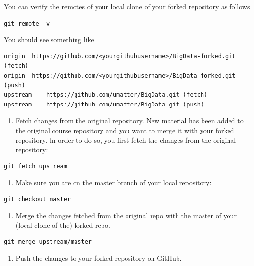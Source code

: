 \documentclass[
  12pt,
]{style/krantz}
\providecommand{\tightlist}{%
  \setlength{\itemsep}{0pt}\setlength{\parskip}{0pt}}
\begin{document}
You can verify the remotes of your local clone of your forked repository as follows

\begin{verbatim}
git remote -v
\end{verbatim}

You should see something like

\begin{verbatim}
origin  https://github.com/<yourgithubusername>/BigData-forked.git (fetch)
origin  https://github.com/<yourgithubusername>/BigData-forked.git (push)
upstream    https://github.com/umatter/BigData.git (fetch)
upstream    https://github.com/umatter/BigData.git (push)
\end{verbatim}

\begin{enumerate}
\def\labelenumi{\arabic{enumi}.}
\setcounter{enumi}{4}
\tightlist
\item
  Fetch changes from the original repository. New material has been added to the original course repository and you want to merge it with your forked repository. In order to do so, you first fetch the changes from the original repository:
\end{enumerate}

\begin{verbatim}
git fetch upstream
\end{verbatim}

\begin{enumerate}
\def\labelenumi{\arabic{enumi}.}
\setcounter{enumi}{5}
\tightlist
\item
  Make sure you are on the master branch of your local repository:
\end{enumerate}

\begin{verbatim}
git checkout master
\end{verbatim}

\begin{enumerate}
\def\labelenumi{\arabic{enumi}.}
\setcounter{enumi}{6}
\tightlist
\item
  Merge the changes fetched from the original repo with the master of your (local clone of the) forked repo.
\end{enumerate}

\begin{verbatim}
git merge upstream/master
\end{verbatim}

\begin{enumerate}
\def\labelenumi{\arabic{enumi}.}
\setcounter{enumi}{7}
\tightlist
\item
  Push the changes to your forked repository on GitHub.
\end{enumerate}
\end{document}
